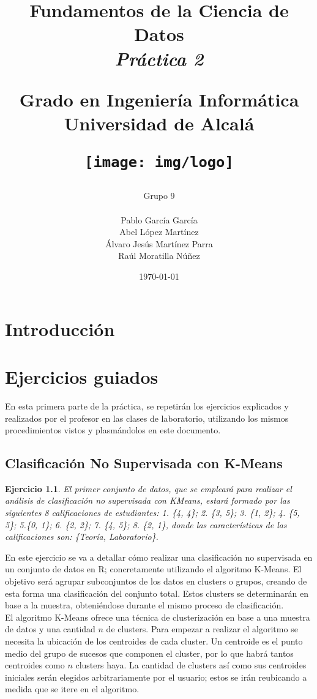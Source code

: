 \documentclass[12pt]{report}\usepackage[]{graphicx}\usepackage[dvipsnames]{xcolor}
\title{
	\huge
	\noindent\textbf{Fundamentos de la Ciencia de Datos}\\
	
	{\Large \textit{Práctica 2}}
	\vspace{1cm}
	
	\huge
	Grado en Ingeniería Informática\\
	Universidad de Alcalá\\
	
	\vspace{1cm}
	
	\texttt{[image: img/logo]}
}
\author{
	Grupo 9\\\\
	Pablo García García\\
	Abel López Martínez\\
	Álvaro Jesús Martínez Parra\\
	Raúl Moratilla Núñez
}
\date{
	\large{\today}
}
\newtheorem{exercise}{Ejercicio}[section]
\begin{document}
	
	\renewcommand{\chaptername}{Parte}
	\renewcommand{\lstlistingname}{Código}
	\maketitle \thispagestyle{empty}
	
	\newpage
	
	\setcounter{tocdepth}{3}
	\tableofcontents
	
	\chapter*{Introducción}\pagestyle{plain}
	
	\chapter{Ejercicios guiados}\pagestyle{fancy}
	
	En esta primera parte de la práctica, se repetirán los ejercicios explicados y realizados por el profesor en las clases de laboratorio, utilizando los mismos procedimientos vistos y plasmándolos en este documento.
	
	\section{Clasificación No Supervisada con K-Means}
	
	\begin{exercise}
		El primer conjunto de datos, que se empleará para realizar el análisis de clasificación no supervisada con KMeans, estará formado por las siguientes 8 calificaciones de estudiantes: 1. \{4, 4\}; 2. \{3, 5\}; 3. \{1, 2\}; 4. \{5, 5\}; 5.\{0, 1\}; 6. \{2, 2\}; 7. \{4, 5\}; 8. \{2, 1\}, donde las características de las calificaciones son: \{Teoría, Laboratorio\}.
	\end{exercise}
	
	En este ejercicio se va a detallar cómo realizar una clasificación no supervisada en un conjunto de datos en R; concretamente utilizando el algoritmo K-Means. El objetivo será agrupar subconjuntos de los datos en clusters o grupos, creando de esta forma una clasificación del conjunto total. Estos clusters se determinarán en base a la muestra, obteniéndose durante el mismo proceso de clasificación.\\
	
	El algoritmo K-Means ofrece una técnica de clusterización en base a una muestra de datos y una cantidad $n$ de clusters. Para empezar a realizar el algoritmo se necesita la ubicación de los centroides de cada cluster. Un centroide es el punto medio del grupo de sucesos que componen el cluster, por lo que habrá tantos centroides como $n$ clusters haya. La cantidad de clusters así como sus centroides iniciales serán elegidos arbitrariamente por el usuario; estos se irán reubicando a medida que se itere en el algoritmo. \\
	
\end{document}
